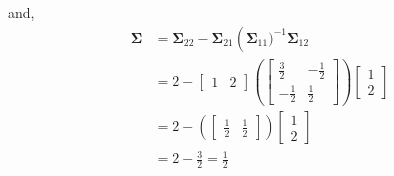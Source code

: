 \documentclass[12pt]{article}\usepackage[]{graphicx}\usepackage[]{color}
\newenvironment{problem}[2][Problem]{\begin{trivlist}
\item[\hskip \labelsep {\bfseries #1}\hskip \labelsep {\bfseries #2.}]}{\end{trivlist}}
\newcommand{\vct}{\mathbf}
\begin{document}
\begin{enumerate}[a)]
and,
\begin{align*}
\vct{\Sigma} &= \vct{\Sigma}_{22} - \vct{\Sigma}_{21}\left(\vct{\Sigma}_{11})^{-1}\vct{\Sigma}_{12}\\
&= 2 - \begin{bmatrix} 1 & 2 \end{bmatrix}\left(\begin{bmatrix} \frac{3}{2} & -\frac{1}{2} \\ -\frac{1}{2} & \frac{1}{2} \end{bmatrix} \right) \begin{bmatrix} 1 \\ 2 \end{bmatrix}\\
&= 2 - \left(\begin{bmatrix} \frac{1}{2} & \frac{1}{2} \end{bmatrix}\right) \begin{bmatrix} 1 \\ 2 \end{bmatrix}\\
&= 2 - \frac{3}{2} = \frac{1}{2}
\end{align*}


\end{enumerate}


\begin{problem}{4.6}
\end{problem}
\end{document}
